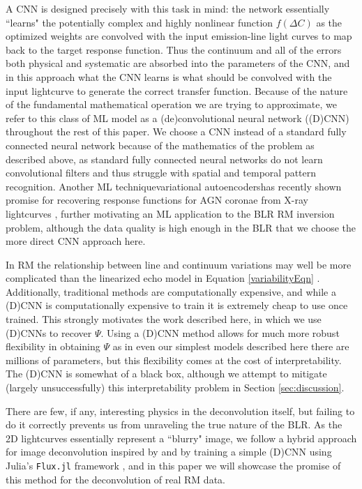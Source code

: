 \documentclass[floatfix,twocolumn,trackchanges,linenumbers]{aastex7}
\begin{document}
A CNN is designed precisely with this task in mind: the network essentially ``learns" the potentially complex and highly nonlinear function $f(\Delta C)$ as the optimized weights are convolved with the input emission-line light curves to map back to the target response function. Thus the continuum and all of the errors both physical and systematic are absorbed into the parameters of the CNN, and in this approach what the CNN learns is what should be convolved with the input lightcurve to generate the correct transfer function. Because of the nature of the fundamental mathematical operation we are trying to approximate, we refer to this class of ML model as a (de)convolutional neural network ((D)CNN) throughout the rest of this paper.
We choose a CNN instead of a standard fully connected neural network because of the mathematics of the problem as described above, as standard fully connected
neural networks do not learn convolutional filters and thus struggle with spatial and temporal pattern recognition.
Another ML technique\textemdash variational autoencoders\textemdash has recently shown promise for recovering response functions for AGN coronae from X-ray lightcurves \citep{Deesamutara_AndyYoung_2025_ML_RM_XRAY}, further motivating an ML application to the BLR RM inversion problem, although the data quality is high enough in the BLR that
we choose the more direct CNN approach here.

In RM the relationship between line and continuum variations may well be more complicated than the linearized echo model in Equation \ref{variabilityEqn} \citep{Krolik1995_regularizedLinearInversion}. Additionally, traditional methods are computationally expensive, and while a (D)CNN is computationally expensive to train it is extremely cheap to use once trained. This strongly motivates the work described here, in which we use (D)CNNs to recover $\Psi$. Using a (D)CNN method allows for much more robust flexibility in obtaining $\Psi$ as in even our simplest models described here there are millions of parameters, but this flexibility comes at the cost of interpretability. The (D)CNN is somewhat of a black box, although we attempt to mitigate (largely unsuccessfully) this interpretability problem in Section \ref{sec:discussion}.

There are few, if any, interesting physics in the deconvolution itself, but failing to do it correctly prevents us from unraveling the true nature of the BLR. As the 2D lightcurves essentially represent a ``blurry" image, we follow a hybrid approach for image deconvolution inspired by \cite{MicrosoftLenovoDeconv} and \cite{RESNET_2015} by training a simple (D)CNN using Julia's \texttt{Flux.jl} framework \citep{flux1,flux2}, and in this paper we will showcase the promise of this method for the deconvolution of real RM data.
\end{document}

